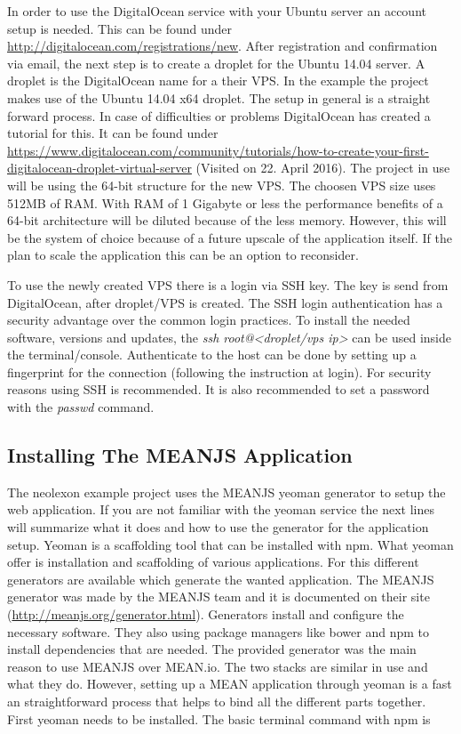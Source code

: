 In order to use the DigitalOcean service with your Ubuntu server an account setup is needed. This can be found under \url{http://digitalocean.com/registrations/new}. After
registration and confirmation via email, the next step is to create a droplet for the Ubuntu 14.04 server. A droplet is the DigitalOcean name for a their VPS.
In the example the project makes use of the Ubuntu 14.04 x64 droplet. The setup in general is a straight forward process. In case of difficulties or problems DigitalOcean has
created a tutorial for this. It can be found under \url{https://www.digitalocean.com/community/tutorials/how-to-create-your-first-digitalocean-droplet-virtual-server} (Visited on 22. April 2016).
The project in use will be using the 64-bit structure for the new VPS. The choosen VPS size uses 512MB of RAM. With RAM of 1 Gigabyte or less the performance benefits of a 64-bit
architecture will be diluted because of the less memory. However, this will be the system of choice because of a future upscale of the application itself. If the plan
to scale the application this can be an option to reconsider.

To use the newly created VPS there is a login via SSH key. The key is send from DigitalOcean, after droplet/VPS is created. The SSH login authentication has a security
advantage over the common login practices. To install the needed software, versions and updates, the \textit{ssh root@<droplet/vps ip>} can be used inside the
terminal/console. Authenticate to the host can be done by setting up a fingerprint for the connection (following the instruction at login). For security reasons
using SSH is recommended. It is also recommended to set a password with the \textit{passwd} command.

\subsection{Installing The MEANJS Application}
The neolexon example project uses the MEANJS yeoman generator to setup the web application. If you are not familiar with the yeoman service the next lines
will summarize what it does and how to use the generator for the application setup. Yeoman is a scaffolding tool that can be installed with npm. What yeoman offer is
installation and scaffolding of various applications. For this different generators are available which generate the wanted application. The MEANJS generator
was made by the MEANJS team and it is documented on their site (\url{http://meanjs.org/generator.html}). Generators install and configure the necessary software.
They also using package managers like bower and npm to install dependencies that are needed. The provided generator was the main reason to use MEANJS over MEAN.io.
The two stacks are similar in use and what they do. However, setting up a MEAN application through yeoman is a fast an straightforward process that helps to bind all
the different parts together. First yeoman needs to be installed. The basic terminal command with npm is

